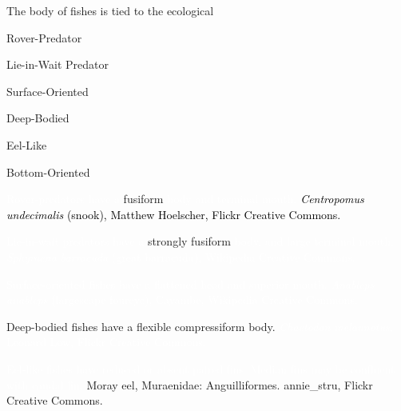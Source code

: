 \documentclass[t]{beamer}
\begin{document}
\begin{frame}[t,plain]{The body  of fishes is tied to the ecological }

\hangpara Rover-Predator

\hangpara Lie-in-Wait Predator

\hangpara Surface-Oriented

\hangpara Deep-Bodied

\hangpara Eel-Like

\hangpara Bottom-Oriented

\end{frame}

{
\begin{frame}[b,plain]{\textcolor{white}{Rover-predators have a} \textcolor{orange6}{fusiform} \textcolor{white}{body and terminal mouth.}}
\hfill\tiny\textcolor{black}{\textit{Centropomus undecimalis} (snook), Matthew Hoelscher, Flickr Creative Commons.}
\end{frame}
}

{
\begin{frame}[b,plain]{\textcolor{white}{Lie-in-wait predators have a} \textcolor{orange6}{strongly fusiform} \textcolor{white}{body, and large terminal mouth.}}
\hfill\tiny\textcolor{white}{\textit{Sphyraena barracuda} (great barracuda), Wikipedia Creative Commons.}
\end{frame}
}

{
\begin{frame}[b,plain]{\textcolor{white}{Surface-oriented fishes have a flattened head and superior mouth.}}
\hfill\tiny\textcolor{white}{\textit{Anableps anableps} (largescape foureye), Cayambe, Wikipedia Creative Commons.}
\end{frame}
}

{
\begin{frame}[b,plain]{Deep-bodied fishes have a flexible \textcolor{orange6}{compressiform} body.}
\hfill\tiny\textcolor{white}{\textit{Chaetodon melannotus}, Leonard Low, Flickr Creative Commons.}
\end{frame}
}

{
\begin{frame}[b,plain]{\textcolor{white}{Eel-like fishes have reduced or absent paired fins. Median fins may be confluent with caudal fin.}}
\hfill\tiny\textcolor{orange7}{Moray eel, Muraenidae: Anguilliformes. annie\_stru, Flickr Creative Commons.}
\end{frame}
}
\end{document}
